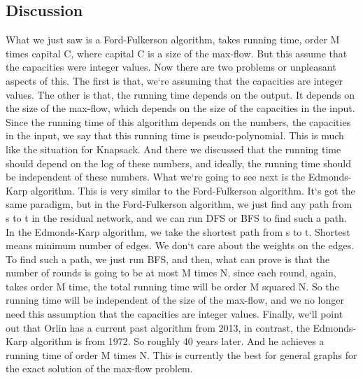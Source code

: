 \subsection{Discussion}
What we just saw is a Ford-Fulkerson algorithm, takes running time, order M times capital C, where capital C is a size of the max-flow.
But this assume that the capacities were integer values.
Now there are two problems or unpleasant aspects of this.
The first is that, we`re assuming that the capacities are integer values.
The other is that, the running time depends on the output.
It depends on the size of the max-flow, which depends on the size of the capacities in the input.
Since the running time of this algorithm depends on the numbers, the capacities in the input, we say that this running time is pseudo-polynomial.
This is much like the situation for Knapsack.
And there we discussed that the running time should depend on the log of these numbers, and ideally, the running time should be independent of these numbers.
What we`re going to see next is the Edmonds-Karp algorithm.
This is very similar to the Ford-Fulkerson algorithm.
It`s got the same paradigm, but in the Ford-Fulkerson algorithm, we just find any path from s to t in the residual network, and we can run DFS or BFS to find such a path.
In the Edmonds-Karp algorithm, we take the shortest path from s to t.
Shortest means minimum number of edges.
We don`t care about the weights on the edges.
To find such a path, we just run BFS, and then, what can prove is that the number of rounds is going to be at most M times N, since each round, again, takes order M time, the total running time will be order M squared N\@.
So the running time will be independent of the size of the max-flow, and we no longer need this assumption that the capacities are integer values.
Finally, we`ll point out that Orlin has a current past algorithm from 2013, in contrast, the Edmonds-Karp algorithm is from 1972.
So roughly 40 years later.
And he achieves a running time of order M times N\@.
This is currently the best for general graphs for the exact solution of the max-flow problem.


